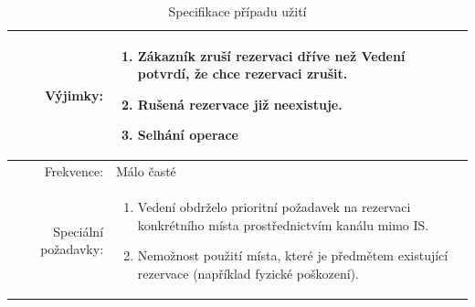 \begin{center}
\begin{table}[ht!]
{\begin{tabular}{| r | p{12cm} |}
    Výjimky: & 
    \begin{minipage}[t]{0.75\textwidth}
    	\begin{enumerate}[nosep,after=\strut]
    		\item Zákazník zruší rezervaci dříve než Vedení potvrdí, že chce rezervaci zrušit.
            \item Rušená rezervace již neexistuje. 
            \item Selhání operace
    	\end{enumerate}
  	\end{minipage} \\
    \hline
    Frekvence: & Málo časté \\
    \hline
    Speciální požadavky: & 
    \begin{minipage}[t]{0.75\textwidth}
    	\begin{enumerate}[nosep,after=\strut]
    		\item Vedení obdrželo prioritní požadavek na rezervaci konkrétního místa prostřednictvím kanálu mimo IS.
            \item Nemožnost použití místa, které je předmětem existující rezervace (například fyzické poškození).
    	\end{enumerate}
  	\end{minipage} \\
    \hline
\end{tabular}}
\caption{Specifikace případu užití }
\label{table:7}
\end{table}
\end{center}


